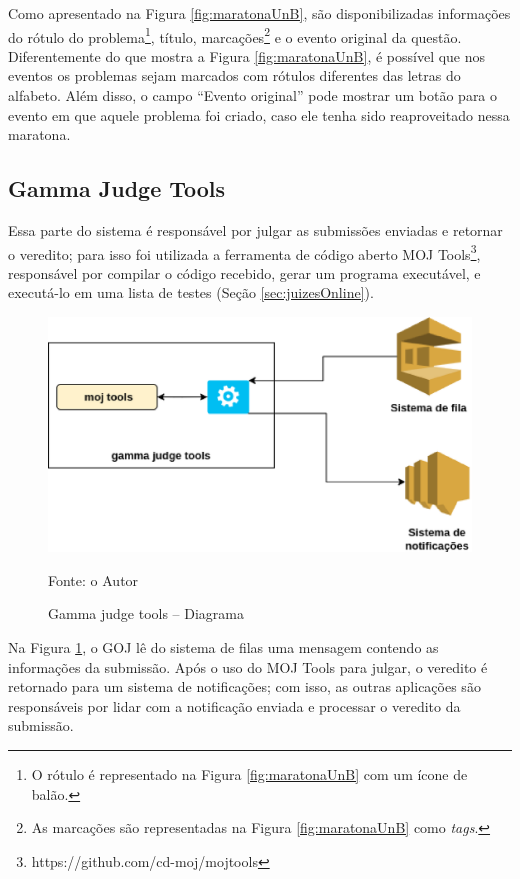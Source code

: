 Como apresentado na Figura \ref{fig:maratonaUnB}, são disponibilizadas informações do rótulo do problema\footnote{O rótulo é representado na Figura \ref{fig:maratonaUnB} com um ícone de balão.}, título, marcações\footnote{As marcações são representadas na Figura \ref{fig:maratonaUnB} como \textit{tags}.} e o evento original da questão. Diferentemente do que mostra a Figura \ref{fig:maratonaUnB}, é possível que nos eventos os problemas sejam marcados com rótulos diferentes das letras do alfabeto. Além disso, o campo ``Evento original'' pode mostrar um botão para o evento em que aquele problema foi criado, caso ele tenha sido reaproveitado nessa maratona.

\subsection{Gamma Judge Tools}
\label{sec:gamaJudgeTools}

Essa parte do sistema é responsável por julgar as submissões enviadas e retornar o veredito; para isso foi utilizada a ferramenta de código aberto MOJ Tools\footnote{https://github.com/cd-moj/mojtools}, responsável por compilar o código recebido, gerar um programa executável, e executá-lo em uma lista de testes (Seção \ref{sec:juizesOnline}).

\begin{figure}
    \centering
    \caption{Gamma judge tools -- Diagrama}
    \includegraphics[keepaspectratio=true,scale=0.5]{figuras/gamma_judge_tools_diagram.eps}
    \label{fig:judge_tools_diagram}
    
    \medskip
    Fonte: o Autor
    \medskip
\end{figure}

Na Figura \ref{fig:judge_tools_diagram}, o GOJ lê do sistema de filas uma mensagem contendo as informações da submissão. Após o uso do MOJ Tools para julgar, o veredito é retornado para um sistema de notificações; com isso, as outras aplicações são responsáveis por lidar com a notificação enviada e processar o veredito da submissão. 

